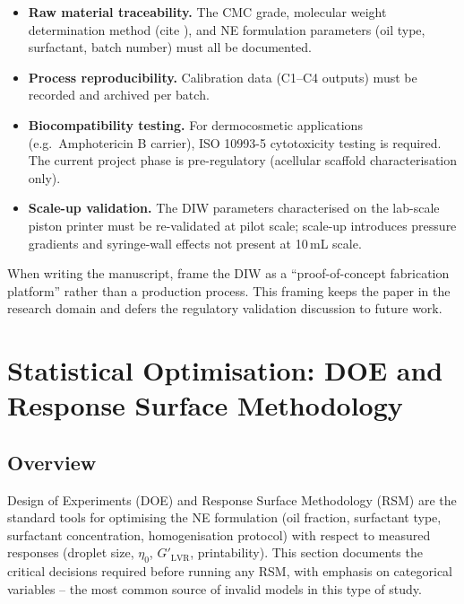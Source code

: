 \documentclass[11pt,a4paper]{article}
\begin{document}
\begin{itemize}[leftmargin=1.6em,itemsep=2pt]
\item \textbf{Raw material traceability.} The CMC grade, molecular weight
  determination method (cite \citealt{daSilva2018}), and NE formulation
  parameters (oil type, surfactant, batch number) must all be documented.
\item \textbf{Process reproducibility.} Calibration data (C1--C4 outputs)
  must be recorded and archived per batch.
\item \textbf{Biocompatibility testing.} For dermocosmetic applications
  (e.g.\ Amphotericin B carrier), ISO 10993-5 cytotoxicity testing is
  required. The current project phase is pre-regulatory (acellular
  scaffold characterisation only).
\item \textbf{Scale-up validation.} The DIW parameters characterised on
  the lab-scale piston printer must be re-validated at pilot scale;
  scale-up introduces pressure gradients and syringe-wall effects not
  present at 10\,mL scale.
\end{itemize}

\begin{tipbox}
When writing the manuscript, frame the DIW as a ``proof-of-concept
fabrication platform'' rather than a production process. This framing
keeps the paper in the research domain and defers the regulatory
validation discussion to future work.
\end{tipbox}

\section{Statistical Optimisation: DOE and Response Surface Methodology}
\label{sec:doe}

\subsection{Overview}

Design of Experiments (DOE) and Response Surface Methodology (RSM)
are the standard tools for optimising the NE formulation (oil fraction,
surfactant type, surfactant concentration, homogenisation protocol)
with respect to measured responses (droplet size, $\eta_0$, $G'_\mathrm{LVR}$,
printability). This section documents the critical decisions required
before running any RSM, with emphasis on categorical variables -- the
most common source of invalid models in this type of study.
\end{document}

